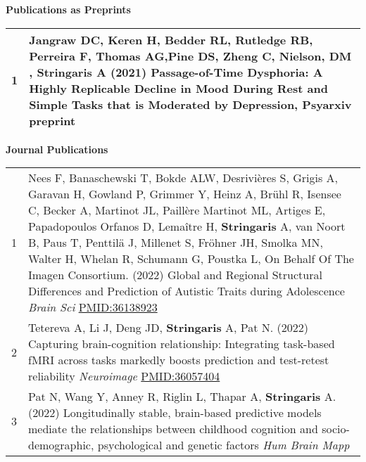 \documentclass[
]{article}
\begin{document}
\textbf{Publications as Preprints}

\begin{longtable}[]{@{}rl@{}}
\toprule
\endhead
1 & Jangraw DC, Keren H, Bedder RL, Rutledge RB, Perreira F, Thomas
AG,Pine DS, Zheng C, Nielson, DM , \textbf{Stringaris} A (2021)
Passage-of-Time Dysphoria: A Highly Replicable Decline in Mood During
Rest and Simple Tasks that is Moderated by Depression, Psyarxiv
preprint\tabularnewline
\bottomrule
\end{longtable}

\textbf{Journal Publications}

\begin{longtable}[]{@{}ll@{}}
\toprule
\endhead
\begin{minipage}[t]{0.01\columnwidth}\raggedright
1\strut
\end{minipage} & \begin{minipage}[t]{0.94\columnwidth}\raggedright
Nees F, Banaschewski T, Bokde ALW, Desrivières S, Grigis A, Garavan H,
Gowland P, Grimmer Y, Heinz A, Brühl R, Isensee C, Becker A, Martinot
JL, Paillère Martinot ML, Artiges E, Papadopoulos Orfanos D, Lemaître H,
\textbf{Stringaris} A, van Noort B, Paus T, Penttilä J, Millenet S,
Fröhner JH, Smolka MN, Walter H, Whelan R, Schumann G, Poustka L, On
Behalf Of The Imagen Consortium. (2022) Global and Regional Structural
Differences and Prediction of Autistic Traits during Adolescence
\emph{Brain Sci} \url{PMID:36138923}\strut
\end{minipage}\tabularnewline
\begin{minipage}[t]{0.01\columnwidth}\raggedright
2\strut
\end{minipage} & \begin{minipage}[t]{0.94\columnwidth}\raggedright
Tetereva A, Li J, Deng JD, \textbf{Stringaris} A, Pat N. (2022)
Capturing brain-cognition relationship: Integrating task-based fMRI
across tasks markedly boosts prediction and test-retest reliability
\emph{Neuroimage} \url{PMID:36057404}\strut
\end{minipage}\tabularnewline
\begin{minipage}[t]{0.01\columnwidth}\raggedright
3\strut
\end{minipage} & \begin{minipage}[t]{0.94\columnwidth}\raggedright
Pat N, Wang Y, Anney R, Riglin L, Thapar A, \textbf{Stringaris} A.
(2022) Longitudinally stable, brain-based predictive models mediate the
relationships between childhood cognition and socio-demographic,
psychological and genetic factors \emph{Hum Brain Mapp}

\end{minipage}
\end{longtable}
\end{document}
